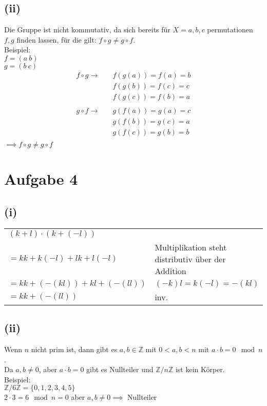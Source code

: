 \documentclass{article}
\begin{document}
\subsection*{(ii)}
Die Gruppe ist nicht kommutativ, da sich bereits für $X = {a, b, c}$ permutationen $f, g$ finden lassen, für die gilt: $f \circ g \neq g \circ f$. \\
Beispiel: \\
$f = (a \: b)$ \\
$g = (b \: c)$
\begin{align*}
    f \circ g \to & \quad f(g(a)) = f(a) = b \\
    & \quad f(g(b)) = f(c) = c \\
    & \quad f(g(c)) = f(b) = a \\ 
\end{align*}
\begin{align*}
    g \circ f \to & \quad g(f(a)) = g(a) = c \\
    & \quad g(f(b)) = g(c) = a \\
    & \quad g(f(c)) = g(b) = b \\ 
\end{align*}
$\implies f \circ g \neq g \circ f$

\section*{Aufgabe 4}
\subsection*{(i)}
\begin{tabular}{l l}
    $(k+l) \cdot (k + (-l))$ & \\
    $=kk+k(-l)+lk+l(-l)$ & Multiplikation steht distributiv über der Addition \\
    $=kk + (-(kl)) + kl + (-(ll))$ & $(-k)l = k(-l) = -(kl)$ \\
    $=kk + (-(ll))$ & inv.
\end{tabular}
\subsection*{(ii)}
Wenn $n$ nicht prim ist, dann gibt es $a, b \in \mathbb{Z}$ mit $0 < a, b < n$ mit $a \cdot b = 0 \mod n$. \\
Da $a, b \neq 0$, aber $a \cdot b = 0$ gibt es Nullteiler und $\mathbb{Z}/n\mathbb{Z}$ ist kein Körper. \\
Beispiel: \\
$\mathbb{Z}/6\mathbb{Z} = \{0, 1, 2, 3, 4, 5\}$ \\
$2 \cdot 3 = 6 \mod n = 0$ aber $a, b \neq 0 \implies$ Nullteiler
\end{document}
